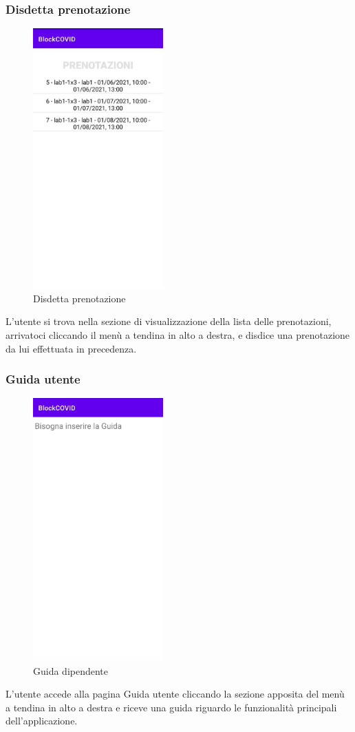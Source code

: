 \subsubsection{Disdetta prenotazione}
\begin{figure}[H]
	\centering
	\includegraphics[width=5cm]{res/images/VisualizzaPrenotazioni.png}
	\caption{Disdetta prenotazione}
\end{figure}
L’utente si trova nella sezione di visualizzazione della lista delle prenotazioni, arrivatoci cliccando il menù a tendina in alto a destra, e disdice una prenotazione da lui effettuata in precedenza.
\subsubsection{Guida utente}
\begin{figure}[H]
	\centering
	\includegraphics[width=5cm]{res/images/Guida.png}
	\caption{Guida dipendente}
\end{figure}
L’utente accede alla pagina Guida utente cliccando la sezione apposita del menù a tendina in alto a destra e riceve una guida riguardo le funzionalità principali dell'applicazione.
